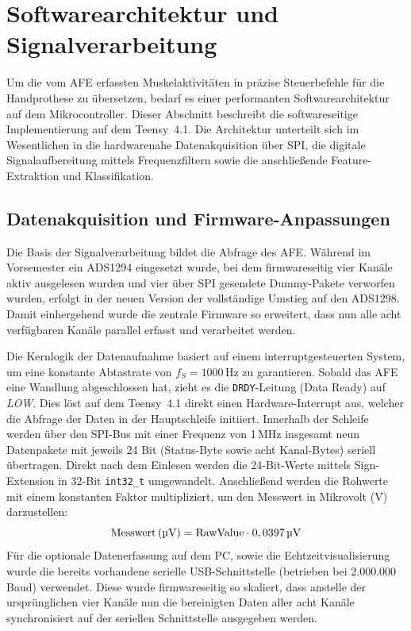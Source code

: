 \section{Softwarearchitektur und Signalverarbeitung}
\label{sec:software}
    Um die vom \acf{AFE} erfassten Muskelaktivitäten in präzise Steuerbefehle für die Handprothese zu übersetzen, bedarf es einer performanten Softwarearchitektur auf dem Mikrocontroller. Dieser Abschnitt beschreibt die softwareseitige Implementierung auf dem \textsf{Teensy~4.1}. Die Architektur unterteilt sich im Wesentlichen in die hardwarenahe Datenakquisition über \ac{SPI}, die digitale Signalaufbereitung mittels Frequenzfiltern sowie die anschließende Feature-Extraktion und Klassifikation.
    \subsection{Datenakquisition und Firmware-Anpassungen}
    \label{subsec:firmware_main}
        Die Basis der Signalverarbeitung bildet die Abfrage des \ac{AFE}. Während im Vorsemester ein \textsf{ADS1294} eingesetzt wurde, bei dem firmwareseitig vier Kanäle aktiv ausgelesen wurden und vier über \ac{SPI} gesendete Dummy-Pakete verworfen wurden, erfolgt in der neuen Version der vollständige Umstieg auf den \textsf{ADS1298}. Damit einhergehend wurde die zentrale Firmware so erweitert, dass nun alle acht verfügbaren Kanäle parallel erfasst und verarbeitet werden.

        Die Kernlogik der Datenaufnahme basiert auf einem interruptgesteuerten System, um eine konstante Abtastrate von $f_S = 1000$\,Hz zu garantieren. Sobald das \ac{AFE} eine Wandlung abgeschlossen hat, zieht es die \texttt{DRDY}-Leitung (Data Ready) auf \textit{LOW}. Dies löst auf dem \textsf{Teensy~4.1} direkt einen Hardware-Interrupt aus, welcher die Abfrage der Daten in der Hauptschleife initiiert. Innerhalb der Schleife werden über den \ac{SPI}-Bus mit einer Frequenz von 1\,MHz insgesamt neun Datenpakete mit jeweils 24 Bit (Status-Byte sowie acht Kanal-Bytes) seriell übertragen. Direkt nach dem Einlesen werden die 24-Bit-Werte mittels Sign-Extension in 32-Bit \texttt{int32\_t} umgewandelt. Anschließend werden die Rohwerte mit einem konstanten Faktor multipliziert, um den Messwert in Mikrovolt (\textmu V) darzustellen:
        \begin{equation*}
            \text{Messwert\,(\textmu V)} = \text{RawValue} \cdot 0,0397 \text{\,\textmu V}
        \end{equation*}
        Für die optionale Datenerfassung auf dem PC, sowie die Echtzeitvisualisierung wurde die bereits vorhandene serielle USB-Schnittstelle (betrieben bei 2.000.000 Baud) verwendet. Diese wurde firmwareseitig so skaliert, dass anstelle der ursprünglichen vier Kanäle nun die bereinigten Daten aller acht Kanäle synchronisiert auf der seriellen Schnittstelle ausgegeben werden.

